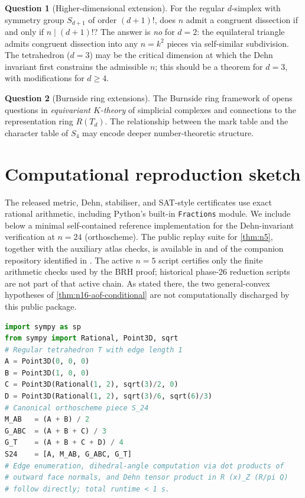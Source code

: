 \documentclass[11pt,a4paper]{article}
\theoremstyle{plain}
\theoremstyle{definition}
\newtheorem{question}[question]{Question}
\theoremstyle{remark}
\newcommand{\Td}{T_{\!d}}
\begin{document}
\begin{question}[Higher-dimensional extension]\label{q:higher-dim}
For the regular $d$-simplex with symmetry group $S_{d+1}$ of order
$(d + 1)!$, does $n$ admit a congruent dissection if and only if
$n \mid (d + 1)!$?  The answer is \emph{no} for $d = 2$: the equilateral
triangle admits congruent dissection into any $n = k^{2}$ pieces via
self-similar subdivision.  The tetrahedron ($d = 3$) may be the critical
dimension at which the Dehn invariant first constrains the admissible
$n$; this should be a theorem for $d = 3$, with modifications for
$d \geq 4$.
\end{question}

\begin{question}[Burnside ring extensions]\label{q:burnside-ext}
The Burnside ring framework of  opens questions in
\emph{equivariant $K$-theory} of simplicial complexes and connections to
the representation ring $R(\Td)$.  The relationship between the mark
table and the character table of $S_{4}$ may encode deeper
number-theoretic structure.
\end{question}

\appendix

\section{Computational reproduction sketch}\label{app:computational}

The released metric, Dehn, stabiliser, and SAT-style certificates use exact
rational arithmetic, including Python's built-in \texttt{Fractions} module.
We include below a minimal self-contained reference implementation for the
Dehn-invariant verification at $n = 24$ (orthoscheme).  The public replay suite
for \cref{thm:n5}, together with the auxiliary atlas checks, is available in
 and  of the companion repository identified in
.  The active $n=5$ script certifies only the finite arithmetic
checks used by the BRH proof; historical phase-26 reduction scripts are not
part of that active chain.  As stated there, the two general-convex hypotheses of
\cref{thm:n16-aof-conditional} are not computationally discharged by this
public package.

\begin{lstlisting}[language=Python,caption={Minimal SymPy verification of
the Dehn scaling $D(S_{24}) = D(T)/24$ for the orthoscheme piece.},
label={lst:dehn-24}]
import sympy as sp
from sympy import Rational, Point3D, sqrt
# Regular tetrahedron T with edge length 1
A = Point3D(0, 0, 0)
B = Point3D(1, 0, 0)
C = Point3D(Rational(1, 2), sqrt(3)/2, 0)
D = Point3D(Rational(1, 2), sqrt(3)/6, sqrt(6)/3)
# Canonical orthoscheme piece S_24
M_AB   = (A + B) / 2
G_ABC  = (A + B + C) / 3
G_T    = (A + B + C + D) / 4
S24    = [A, M_AB, G_ABC, G_T]
# Edge enumeration, dihedral-angle computation via dot products of
# outward face normals, and Dehn tensor product in R (x)_Z (R/pi Q)
# follow directly; total runtime < 1 s.
\end{lstlisting}
\end{document}
